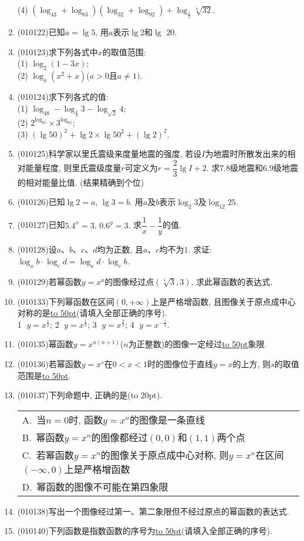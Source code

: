 \documentclass[10pt,a4paper]{article}
\newcommand{\blank}[1]{\underline{\hbox to #1pt{}}}
\newcommand{\bracket}[1]{(\hbox to #1pt{})}
\newcommand{\onech}[4]{\par\begin{tabular}{p{.9\textwidth}}
A.~#1\\
B.~#2\\
C.~#3\\
D.~#4
\end{tabular}}
\begin{document}
\begin{enumerate}[1.]
(4) $(\log_43+\log_83)(\log_32+\log_92)+\log_{\frac 12}\sqrt[4]{32}$.
\item {\tiny (010122)}已知$a=\lg 5$, 用$a$表示$\lg 2$和$\lg$ $20$.
\item {\tiny (010123)}求下列各式中$x$的取值范围:\\
(1) $\log_2(1-3x)$;\\
(2) $\log_a(x^2+x)$($a>0$且$a\ne 1)$.
\item {\tiny (010124)}求下列各式的值:\\
(1) $\log_48-\log_{\frac 19}3-\log_{\sqrt 2}4$;\\
(2) $2^{\log_65}\times 3^{\log_65}$;\\
(3) $(\lg 50)^2+\lg 2\times \lg 50^2+(\lg 2)^2$.
\item {\tiny (010125)}科学家以里氏震级来度量地震的强度, 若设$I$为地震时所散发出来的相对能量程度, 则里氏震级度量$r$可定义为$r=\dfrac 23\lg I+2$. 求$7.8$级地震和$6. 9$级地震的相对能量比值. (结果精确到个位)
\item {\tiny (010126)}已知$\lg 2=a$, $\lg 3=b$. 用$a$及$b$表示$\log_2 3$及$\log_{12}25$.
\item {\tiny (010127)}已知$5.4^x=3$, $0.6^y=3$. 求$\dfrac 1x-\dfrac 1y$的值.
\item {\tiny (010128)}设$a$、$b$、$c$、$d$均为正数, 且$a$、$c$均不为$1$. 求证:
$\log_ab\cdot \log_cd=\log_ad\cdot \log_cb$.
\item {\tiny (010129)}若幂函数$y=x^a$的图像经过点$(\sqrt[4]{3}, 3)$, 求此幂函数的表达式.
\item {\tiny (010133)}下列幂函数在区间$(0, +\infty)$上是严格增函数, 且图像关于原点成中心对称的是\blank{50}(请填入全部正确的序号).\\
\textcircled{1} $y=x^\frac 12$; \textcircled{2} $y=x^\frac 13$; \textcircled{3} $y=x^\frac 23$; \textcircled{4} $y=x^{-\frac 13}$.
\item {\tiny (010135)}幂函数$y=x^{n(n+1)}$($n$为正整数)的图像一定经过\blank{50}象限.
\item {\tiny (010136)}若幂函数$y=x^s$在$0<x<1$时的图像位于直线$y=x$的上方, 则$s$的取值范围是\blank{50}.
\item {\tiny (010137)}下列命题中, 正确的是\bracket{20}.
\onech{当$n=0$时, 函数$y=x^n$的图像是一条直线}{幂函数$y=x^n$的图像都经过$(0, 0)$和$(1, 1)$两个点}{若幂函数$y=x^n$的图像关于原点成中心对称, 则$y=x^n$在区间$(-\infty, 0)$上是严格增函数}{幂函数的图像不可能在第四象限}
\item {\tiny (010138)}写出一个图像经过第一、第二象限但不经过原点的幂函数的表达式.
\item {\tiny (010140)}下列函数是指数函数的序号为\blank{50}(请填入全部正确的序号).\\

\end{enumerate}
\end{document}
